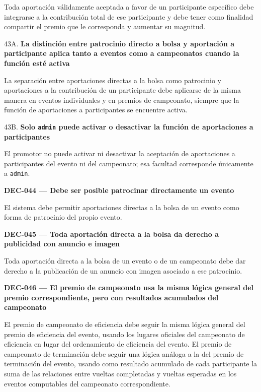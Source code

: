 \documentclass[10pt,letterpaper]{article}
\begin{document}
Toda aportación válidamente aceptada a favor de un participante específico debe integrarse a la contribución total de ese participante y debe tener como finalidad compartir el premio que le corresponda y aumentar su magnitud.\par 43A. \textbf{La distinción entre patrocinio directo a bolsa y aportación a participante aplica tanto a eventos como a campeonatos cuando la función esté activa}\par La separación entre aportaciones directas a la bolsa como patrocinio y aportaciones a la contribución de un participante debe aplicarse de la misma manera en eventos individuales y en premios de campeonato, siempre que la función de aportaciones a participantes se encuentre activa.\par 43B. \textbf{Solo \texttt{admin} puede activar o desactivar la función de aportaciones a participantes}\par El promotor no puede activar ni desactivar la aceptación de aportaciones a participantes del evento ni del campeonato; esa facultad corresponde únicamente a \texttt{admin}.\par\vspace{0.45em}
\noindent\textbf{DEC-044 --- Debe ser posible patrocinar directamente un evento}\par
El sistema debe permitir aportaciones directas a la bolsa de un evento como forma de patrocinio del propio evento.\par\vspace{0.45em}
\noindent\textbf{DEC-045 --- Toda aportación directa a la bolsa da derecho a publicidad con anuncio e imagen}\par
Toda aportación directa a la bolsa de un evento o de un campeonato debe dar derecho a la publicación de un anuncio con imagen asociado a ese patrocinio.\par\vspace{0.45em}
\noindent\textbf{DEC-046 --- El premio de campeonato usa la misma lógica general del premio correspondiente, pero con resultados acumulados del campeonato}\par
El premio de campeonato de eficiencia debe seguir la misma lógica general del premio de eficiencia del evento, usando los lugares oficiales del campeonato de eficiencia en lugar del ordenamiento de eficiencia del evento. El premio de campeonato de terminación debe seguir una lógica análoga a la del premio de terminación del evento, usando como resultado acumulado de cada participante la suma de las relaciones entre vueltas completadas y vueltas esperadas en los eventos computables del campeonato correspondiente.\par\vspace{0.45em}
\end{document}
